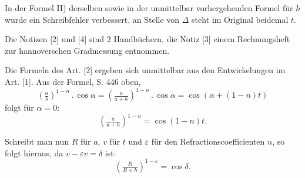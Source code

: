 In der Formel II) derselben sowie in der unmittelbar vorhergehenden Formel für \(h\)
wurde ein Schreibfehler verbessert, an Stelle von \(\Delta\) steht im Original beidemal \(t\).
\par\noindent\hspace*{\parindent}Die Notizen [2] und [4] sind 2 Handbüchern, die Notiz [3] einem
Rechnungsheft zur hannoverschen Gradmessung entnommen.
\par\noindent\hspace*{\parindent}Die Formeln des Art. [2] ergeben sich unmittelbar aus den Entwickelungen
im Art. [1]. Aus der Formel, S. 446 oben,
\[
\left(\tfrac ab\right)^{1-n}\mathbin{.}\cos\alpha
=\left(\tfrac{a}{a+h}\right)^{1-n}\mathbin{.}\cos\alpha
=\cos(\alpha+(1-n)t)
\]
\noindent folgt für \(\alpha=0\):
\[
\left(\tfrac{a}{a+h}\right)^{1-n}=\cos(1-n)t.
\]
\par\noindent\hspace*{\parindent}Schreibt man nun \(R\) für \(a\), \(v\) für \(t\) und
\(\varepsilon\) für den Refractionscoefficienten \(n\), so folgt hieraus,
da \(v-\varepsilon v=\delta\) ist:
\[
\left(\tfrac{R}{R+h}\right)^{1-\varepsilon}=\cos\delta.
\]
\endgroup

